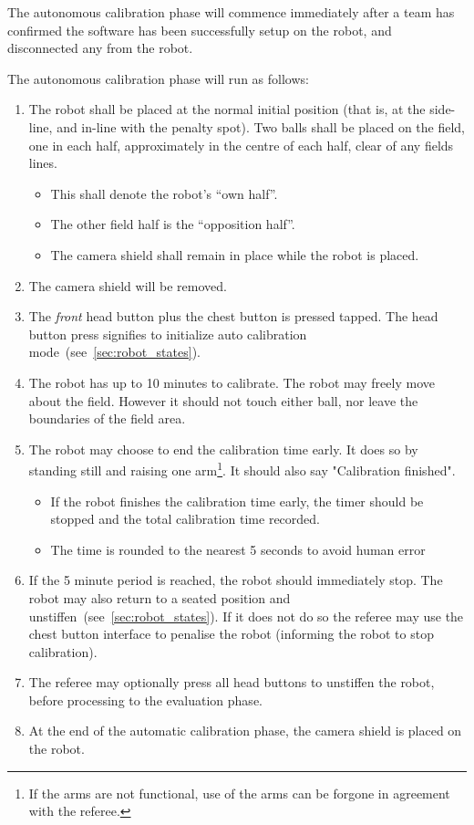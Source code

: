 The autonomous calibration phase will commence immediately after a team has confirmed the software has been successfully setup on the robot, and disconnected any from the robot.

The autonomous calibration phase will run as follows:
\begin{enumerate}
    \item The robot shall be placed at the normal initial position (that is, at the side-line, and in-line with the penalty spot). Two balls shall be placed on the field, one in each half, approximately in the centre of each half, clear of any fields lines.
    \begin{itemize}
        \item This shall denote the robot's  ``own half''.
        \item The other field half is the ``opposition half''.
        \item The camera shield shall remain in place while the robot is placed.
    \end{itemize} 
    \item The camera shield will be removed.
    \item The \textit{front} head button plus the chest button is pressed tapped. The head button press signifies to initialize auto calibration mode~(see~\ref{sec:robot_states}).
    \item The robot has up to 10 minutes to calibrate. The robot may freely move about the field. However it should not touch either ball, nor leave the boundaries of the field area.
    \item The robot may choose to end the calibration time early. It does so by standing still and raising one arm\footnote{If the arms are not functional, use of the arms can be forgone in agreement with the referee.}. It should also say "Calibration finished".
    \begin{itemize}
        \item If the robot finishes the calibration time early, the timer should be stopped and the total calibration time recorded.
        \item The time is rounded to the nearest 5 seconds to avoid human error
    \end{itemize} 
    \item If the 5 minute period is reached, the robot should immediately stop. The robot may also return to a seated position and unstiffen~(see~\ref{sec:robot_states}). If it does not do so the referee may use the chest button interface to penalise the robot (informing the robot to stop calibration). 
    \item The referee may optionally press all head buttons to unstiffen the robot, before processing to the evaluation phase.
    \item At the end of the automatic calibration phase, the camera shield is placed on the robot.
\end{enumerate} 

